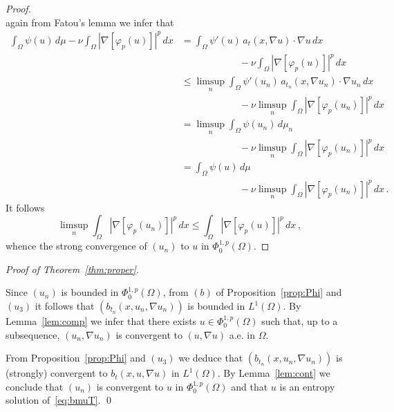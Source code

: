 \documentclass[twoside,reqno]{amsart}
\numberwithin{equation}{section}
\theoremstyle{definition}
\begin{document}
\begin{proof}
\[\]
again from Fatou's lemma we infer that
\[
\begin{split}
\int_{\Omega} \psi(u) \,d\mu
- \nu \int_\Omega |\nabla[\varphi_p(u)]|^p\,dx 
&=
\int_{\Omega} \psi'(u)\,a_{t}(x,\nabla u) \cdot 
\nabla u\,dx \\
&\qquad\qquad\qquad
- \nu \int_\Omega |\nabla[\varphi_p(u)]|^p\,dx  \\
&\leq
\limsup_n \int_\Omega \psi'(u_n)\,a_{t_n}(x,\nabla u_n) 
\cdot \nabla u_n\,dx \\
&\qquad\qquad\qquad
- \nu \limsup_n \int_\Omega |\nabla[\varphi_p(u_n)]|^p\,dx \\
&=
\limsup_n \int_{\Omega} \psi(u_n) \,d\mu_n \\
&\qquad\qquad\qquad
- \nu \limsup_n \int_\Omega |\nabla[\varphi_p(u_n)]|^p\,dx \\
&=
\int_{\Omega} \psi(u) \,d\mu \\
&\qquad\qquad\qquad
- \nu \limsup_n \int_\Omega |\nabla[\varphi_p(u_n)]|^p\,dx \,.
\end{split}
\]
It follows
\[
\limsup_n \int_\Omega |\nabla[\varphi_p(u_n)]|^p\,dx \leq
\int_\Omega |\nabla[\varphi_p(u)]|^p\,dx\,,
\]
whence the strong convergence of $(u_n)$ to
$u$ in $\Phi^{1,p}_0(\Omega)$.
\end{proof}
%
\noindent
\emph{Proof of Theorem~\ref{thm:proper}.}
\par\noindent
Since $(u_n)$ is bounded in $\Phi^{1,p}_0(\Omega)$,
from $(b)$ of Proposition~\ref{prop:Phi} and $(u_3)$ it follows 
that $(b_{t_n}(x,u_n,\nabla u_n))$ is bounded in $L^1(\Omega)$.
By Lemma~\ref{lem:comp} we infer that there exists
$u\in \Phi^{1,p}_0(\Omega)$ such that, up to a subsequence,
$(u_n,\nabla u_n)$ is convergent to $(u,\nabla u)$ 
a.e. in $\Omega$.
\par
From Proposition~\ref{prop:Phi} and $(u_3)$ we deduce 
that $(b_{t_n}(x,u_n,\nabla u_n))$ is (strongly) convergent to 
$b_t(x,u,\nabla u)$ in $L^1(\Omega)$.
By Lemma~\ref{lem:cont} we conclude that
$(u_n)$ is convergent to $u$ in $\Phi^{1,p}_0(\Omega)$ and that
$u$ is an entropy solution of~\eqref{eq:bmuT}.
\qed
%


\end{document}

